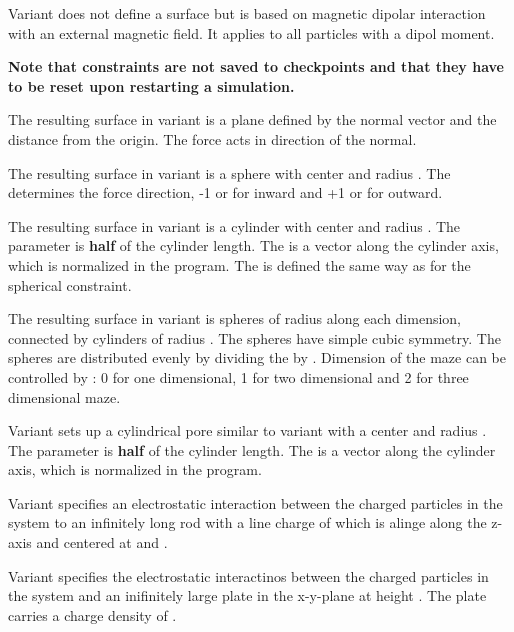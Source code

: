 Variant  does not define a surface but is based on magnetic
dipolar interaction with an external magnetic field. It applies to all particles
with a dipol moment.

\textbf{Note that constraints are not saved to checkpoints and that they have to
be reset upon restarting a simulation.}

The resulting surface in variant  is a plane defined by the
normal vector    and the distance
 from the origin. The force acts in direction of the normal. 

The resulting surface in variant
 is a sphere with center    and radius
. The  determines the force direction, -1 or
 for inward and +1 or  for outward. 

The resulting surface
in variant  is a cylinder with center  
 and radius . The  parameter is \textbf{half} 
of the cylinder length. The  is a
vector along the cylinder axis, which is normalized in the program.
The  is defined the same way as for the spherical
constraint. 

The resulting surface in variant  is 
spheres of radius  along each dimension, connected by
cylinders of radius . The spheres have simple cubic
symmetry. The spheres are distributed evenly by dividing the
 by .  Dimension of the maze can be controlled by
: 0 for one dimensional, 1 for two dimensional and 2 for three
dimensional maze.

Variant  sets up a cylindrical pore similar to variant  
with a center
 and radius . The  parameter is \textbf{half} 
of the cylinder length. The  is a
vector along the cylinder axis, which is normalized in the program.

Variant  specifies an electrostatic interaction between the charged
particles in the system to an infinitely long rod with a
line charge of  which is alinge along the z-axis and centered at
 and .

Variant  specifies the electrostatic interactinos between the charged
particles in the system and an inifinitely large plate in the x-y-plane at
height . The plate carries a charge density of .
  
